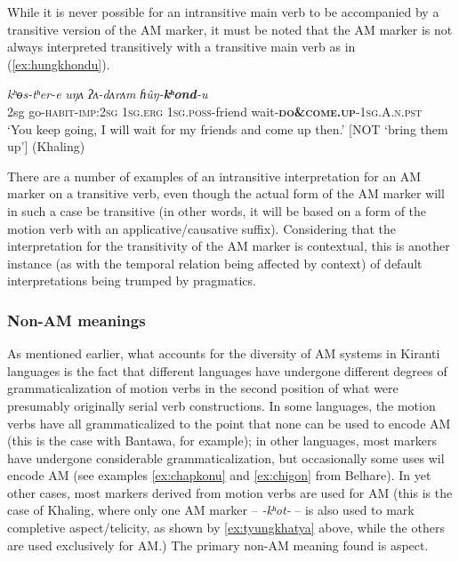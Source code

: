 \documentclass[oneside,a4paper,11pt]{article}
\newcommand{\ipa}[1]{{\phon\textit{#1}}}
\newcommand{\rouge}[1]{\textbf{#1}}
\begin{document}
While it is never possible for an intransitive main verb to be accompanied by a transitive version of the AM marker, it must be noted that the AM marker is not always interpreted transitively with a transitive main verb as in (\ref{ex:hungkhondu}). 

\begin{exe}  
\ex \label{ex:hungkhondu}
 \gll  \ipa{ʔīn} \ipa{kʰɵs-tʰer-e} \ipa{uŋʌ} \ipa{ʔʌ-dʌrʌm} \ipa{ɦûŋ-\rouge{kʰond}-u} \\
 2sg go-\textsc{habit}-\textsc{imp}:\textsc{2sg} \textsc{1sg}.\textsc{erg} \textsc{1sg}.\textsc{poss}-friend wait-\rouge{\textsc{do\&come.up}}-\textsc{1sg.A.n.pst} \\
\glt `You keep going, I will wait for my friends and come up then.' [NOT `bring them up'] (Khaling)
\end{exe}

 There are a number of examples of an intransitive interpretation for an AM marker on a transitive verb, even though the actual form of the AM marker will in such a case be transitive (in other words, it will be based on a form of the motion verb with an applicative/causative suffix).  Considering that the interpretation for the transitivity of the AM marker is contextual, this is another instance (as with the temporal relation being affected by context) of default interpretations being trumped by pragmatics.
  

 \subsubsection{Non-AM meanings} \label{sec:khaling.non.am}
As mentioned earlier, what accounts for the diversity of AM systems in Kiranti languages is the fact that different languages have undergone different degrees of grammaticalization of motion verbs in the second position of what were presumably originally serial verb constructions.  In some languages, the motion verbs have all grammaticalized to the point that none can be used to encode AM (this is the case with Bantawa, for example); in other languages, most markers have undergone considerable grammaticalization, but occasionally some uses wil encode AM (see examples  \ref{ex:chapkonu} and \ref{ex:chigon} from Belhare).  In yet other cases, most markers derived from motion verbs are used for AM (this is the case of Khaling, where only one AM marker -- \ipa{-kʰot-} -- is also used to mark completive aspect/telicity, as shown by \ref{ex:tyungkhatya} above, while the others are used exclusively for AM.)  
The primary non-AM meaning found is aspect.
\end{document}
